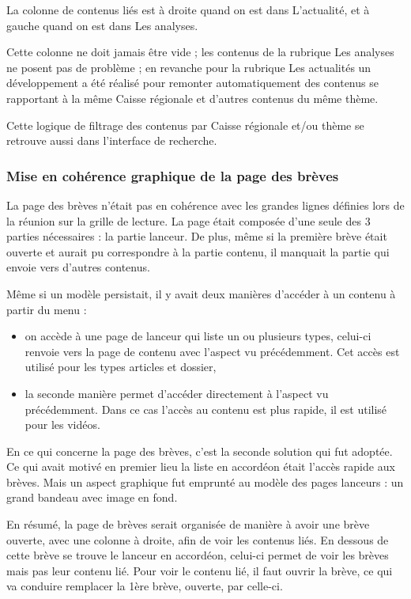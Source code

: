 \documentclass[12pt,a4paper]{article}
\begin{document}
La colonne de contenus liés est à droite quand on est dans L'actualité, et à gauche quand on est dans Les analyses.\par
Cette colonne ne doit jamais être vide ; les contenus de la rubrique Les analyses ne posent pas de problème ; en revanche pour la rubrique Les actualités un développement a été réalisé pour remonter automatiquement des contenus se rapportant à la même Caisse régionale et d'autres contenus du même thème. \par
Cette logique de filtrage des contenus par Caisse régionale et/ou thème se retrouve aussi dans l'interface de recherche.
\bigskip


\newpage
\subsubsection{Mise en cohérence graphique de la page des brèves}
La page des brèves n'était pas en cohérence avec les grandes lignes définies lors de la réunion sur la grille de lecture. La page était composée d'une seule des 3 parties nécessaires : la partie lanceur. De plus, même si la première brève était ouverte et aurait pu correspondre à la partie contenu,  il manquait la partie qui envoie vers d'autres contenus.\par 
Même si un modèle persistait, il y avait deux manières d'accéder à un contenu à partir du menu : 
\begin{itemize}
\item on accède à une page de lanceur qui liste un ou plusieurs types, celui-ci renvoie vers la page de contenu avec l'aspect vu précédemment. Cet accès est utilisé pour les types articles et dossier,
\item la seconde manière permet d'accéder directement à l'aspect vu précédemment. Dans ce cas l'accès au contenu est plus rapide, il est utilisé pour les vidéos. 
\end{itemize}\par 
En ce qui concerne la page des brèves, c'est la seconde solution qui fut adoptée. Ce qui avait motivé en premier lieu la liste en accordéon était l'accès rapide aux brèves. Mais un aspect graphique fut emprunté au modèle des pages lanceurs : un grand bandeau avec image en fond.\par 
\medskip
En résumé, la page de brèves serait organisée de manière à avoir une brève ouverte, avec une colonne à droite, afin de voir les contenus liés. En dessous de cette brève se trouve le lanceur en accordéon, celui-ci permet de voir les brèves mais pas leur contenu lié. Pour voir le contenu lié, il faut ouvrir la brève, ce qui va conduire remplacer la 1ère brève, ouverte, par celle-ci.\par
\end{document}
